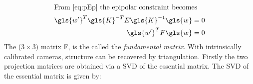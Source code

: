 \begin{align}
    \intertext{From \eqref{eq:pEp} the epipolar constraint becomes}
    \gls{w'}^T \gls{K}^{-T} E \gls{K}^{-1} \gls{w} &= 0 \\
    \gls{w'}^T F \gls{w} &= 0
\end{align}
The (\(3\times3)\) matrix \gls{F}, is the called the \emph{\gls{fundamental matrix}}.
With intrinsically calibrated cameras, structure can be recovered by triangulation.
Firstly the two projection matrices are obtained via a \gls{SVD} of the essential matrix.
The \gls{SVD} of the essential matrix is given by:

